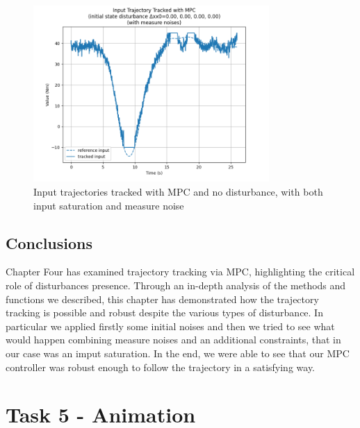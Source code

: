 \documentclass[a4paper,11pt,oneside]{book}
\begin{document}
\begin{figure}[H]
    \centering
    \includegraphics[width=0.8\textwidth]{input_MPC_mnac.png}
    \caption{Input trajectories tracked with MPC and no disturbance, with both input saturation and measure noise}
    \label{fig:enter-label}
\end{figure}

\clearpage

\section{Conclusions}
\begin{justify}
    {Chapter Four has examined trajectory tracking via MPC, highlighting the critical role of disturbances presence. Through an in-depth analysis of the methods and functions we described, this chapter has demonstrated how the trajectory tracking is possible and robust despite the various types of disturbance. In particular we applied firstly some initial noises and then we tried to see what would happen combining measure noises and an additional constraints, that in our case was an imput saturation. In the end, we were able to see that our MPC controller was robust enough to follow the trajectory in a satisfying way.}
\end{justify}

\chapter{Task 5 - Animation}
\end{document}
